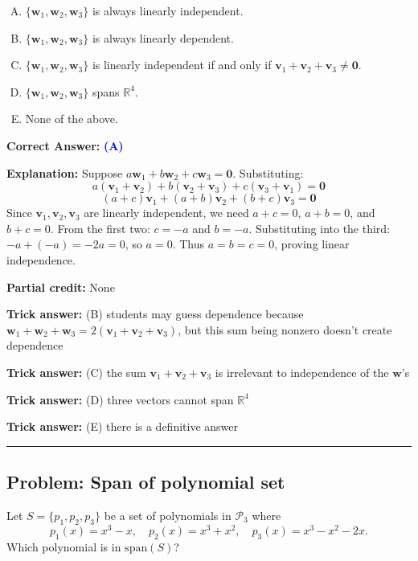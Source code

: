 \documentclass[12pt]{amsart}
\newcommand{\divider}{
  \vspace{-1em}
  \noindent
  \raisebox{-0.15ex}{\textbullet}%
  \hspace{0.5em}%
  \rule[0.5ex]{0.95\textwidth}{1.0pt}%
  \hspace{0.5em}%
  \raisebox{-0.15ex}{\textbullet}%
  \vspace{0em}
}
\begin{document}
\begin{enumerate}[(A)]
\item $\{\mathbf{w}_1, \mathbf{w}_2, \mathbf{w}_3\}$ is always linearly independent.
\item $\{\mathbf{w}_1, \mathbf{w}_2, \mathbf{w}_3\}$ is always linearly dependent.
\item $\{\mathbf{w}_1, \mathbf{w}_2, \mathbf{w}_3\}$ is linearly independent if and only if $\mathbf{v}_1 + \mathbf{v}_2 + \mathbf{v}_3 \neq \mathbf{0}$.
\item $\{\mathbf{w}_1, \mathbf{w}_2, \mathbf{w}_3\}$ spans $\mathbb{R}^4$.
\item None of the above.
\end{enumerate}

\textbf{Correct Answer:} \textcolor{blue}{\textbf{(A)}}

\textbf{Explanation:} Suppose $a\mathbf{w}_1 + b\mathbf{w}_2 + c\mathbf{w}_3 = \mathbf{0}$. Substituting:
$$a(\mathbf{v}_1 + \mathbf{v}_2) + b(\mathbf{v}_2 + \mathbf{v}_3) + c(\mathbf{v}_3 + \mathbf{v}_1) = \mathbf{0}$$
$$(a+c)\mathbf{v}_1 + (a+b)\mathbf{v}_2 + (b+c)\mathbf{v}_3 = \mathbf{0}$$
Since $\mathbf{v}_1, \mathbf{v}_2, \mathbf{v}_3$ are linearly independent, we need $a+c = 0$, $a+b = 0$, and $b+c = 0$.
From the first two: $c = -a$ and $b = -a$. Substituting into the third: $-a + (-a) = -2a = 0$, so $a = 0$.
Thus $a = b = c = 0$, proving linear independence.

\textbf{Partial credit:} None

\textbf{Trick answer:} (B) students may guess dependence because $\mathbf{w}_1 + \mathbf{w}_2 + \mathbf{w}_3 = 2(\mathbf{v}_1 + \mathbf{v}_2 + \mathbf{v}_3)$, but this sum being nonzero doesn't create dependence

\textbf{Trick answer:} (C) the sum $\mathbf{v}_1 + \mathbf{v}_2 + \mathbf{v}_3$ is irrelevant to independence of the $\mathbf{w}$'s

\textbf{Trick answer:} (D) three vectors cannot span $\mathbb{R}^4$

\textbf{Trick answer:} (E) there is a definitive answer

\divider

\subsection*{Problem: Span of polynomial set}

Let $S = \{p_1, p_2, p_3\}$ be a set of polynomials in $\mathcal{P}_3$ where
$$p_1(x) = x^3 - x, \quad p_2(x) = x^3 + x^2, \quad p_3(x) = x^3 - x^2 - 2x.$$
Which polynomial is in $\text{span}(S)$?
\end{document}
